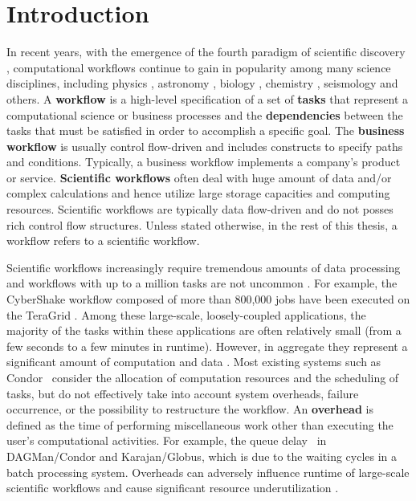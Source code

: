 \chapter{Introduction}


In recent years, with the emergence of the fourth paradigm of scientific discovery \cite{Hey2009}, computational workflows continue to gain in popularity among many science disciplines, including physics \cite{Deelman2002}, astronomy \cite{Sakellariou2010}, biology \cite{Lathers2006, Oinn2004}, chemistry \cite{Wieczorek2005}, seismology \cite{Maechling2007} and others. 
A \textbf{workflow} is a high-level specification of a set of \textbf{tasks} that represent a computational science or business processes and the \textbf{dependencies} between the tasks that must be satisfied in order to accomplish a specific goal. The \textbf{business workflow} is usually control flow-driven and includes constructs to specify paths and conditions. Typically, a business workflow implements a company’s product or service. \textbf{Scientific workflows} often deal with huge amount of data and/or complex calculations and hence utilize large storage capacities and computing resources. Scientific workflows are typically data flow-driven and do not posses rich control flow structures. Unless stated otherwise,  in the rest of this thesis, a workflow refers to a scientific workflow. 


Scientific workflows increasingly require tremendous amounts of data processing and workflows with up to a million tasks are not uncommon \cite{Callaghan2011}. For example, the CyberShake workflow \cite{Rynge2012} composed of more than 800,000 jobs have been executed on the TeraGrid \cite{TeraGrid}. Among these large-scale, loosely-coupled applications, the majority of the tasks within these applications are often relatively small (from a few seconds to a few minutes in runtime). However, in aggregate they represent a significant amount of computation and data \cite{Deelman2002}. Most existing systems such as Condor~\cite{Kalayci2010} consider the allocation of computation resources and the scheduling of tasks, but do not effectively take into account system overheads, failure occurrence, or the possibility to restructure the workflow. 
An \textbf{overhead} is defined as the time of performing miscellaneous work other than executing the user's computational activities. For example, the queue delay~\cite{Stratan2008} in DAGMan/Condor and Karajan/Globus, which is due to the waiting cycles in a batch processing system. Overheads can adversely influence runtime of large-scale scientific workflows and cause significant resource underutilization \cite{Chen2011}. 

